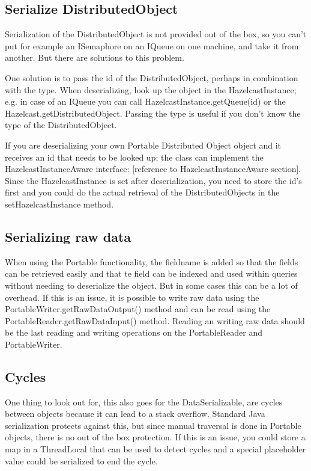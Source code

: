 \subsection*{Serialize DistributedObject}
Serialization of the DistributedObject is not provided out of the box, so you can't put for example an ISemaphore on an IQueue on one machine, and take it from another. But there are solutions to this problem.

One solution is to pass the id of the DistributedObject, perhaps in combination with the type. When deserializing, look up the object in the HazelcastInstance; e.g. in case of an IQueue you can call HazelcastInstance.getQueue(id) or the Hazelcast.getDistributedObject. Passing the type is useful if you don't know the type of the DistributedObject.

If you are deserializing your own Portable Distributed Object object and it receives an id that needs to be looked up; the class can implement the HazelcastInstanceAware interface: [reference to HazelcastInstanceAware section]. Since the HazelcastInstance is set after deserialization, you need to store the id's first and you could do the actual retrieval of the DistributedObjects in the setHazelcastInstance method.

\subsection{Serializing raw data}
When using the Portable functionality, the fieldname is added so that the fields can be retrieved easily and that te field can be indexed and used within queries without needing to deserialize the object. But in some cases this can be a lot of overhead. If this is an issue, it is possible to write raw data using the PortableWriter.getRawDataOutput() method and can be read using the PortableReader.getRawDataInput() method. Reading an writing raw data should be the last reading and writing operations on the PortableReader and PortableWriter.

\subsection*{Cycles}
One thing to look out for, this also goes for the DataSerializable, are cycles between objects because it can lead to a stack overflow. Standard Java serialization protects against this, but since manual traversal is done in Portable objects, there is no out of the box protection. If this is an issue, you could store a map in a ThreadLocal that can be used to detect cycles and a special placeholder value could be serialized to end the cycle.

